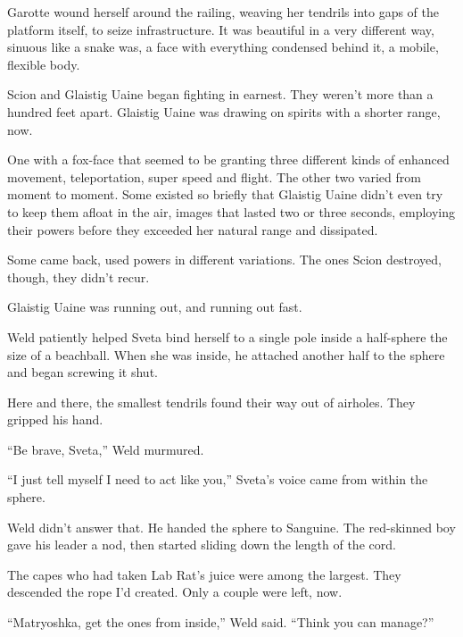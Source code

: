 Garotte wound herself around the railing, weaving her tendrils into gaps of the platform itself, to seize infrastructure.  It was beautiful in a very different way, sinuous like a snake was, a face with everything condensed behind it, a mobile, flexible body.



Scion and Glaistig Uaine began fighting in earnest.  They weren't more than a hundred feet apart.  Glaistig Uaine was drawing on spirits with a shorter range, now.



One with a fox-face that seemed to be granting three different kinds of enhanced movement, teleportation, super speed and flight.  The other two varied from moment to moment.  Some existed so briefly that Glaistig Uaine didn't even try to keep them afloat in the air, images that lasted two or three seconds, employing their powers before they exceeded her natural range and dissipated.



Some came back, used powers in different variations.  The ones Scion destroyed, though, they didn't recur.



Glaistig Uaine was running out, and running out fast.



Weld patiently helped Sveta bind herself to a single pole inside a half-sphere the size of a beachball.  When she was inside, he attached another half to the sphere and began screwing it shut.



Here and there, the smallest tendrils found their way out of airholes.  They gripped his hand.



``Be brave, Sveta,'' Weld murmured.



``I just tell myself I need to act like you,'' Sveta's voice came from within the sphere.



Weld didn't answer that.  He handed the sphere to Sanguine.  The red-skinned boy gave his leader a nod, then started sliding down the length of the cord.



The capes who had taken Lab Rat's juice were among the largest.  They descended the rope I'd created.  Only a couple were left, now.



``Matryoshka, get the ones from inside,'' Weld said.  ``Think you can manage?''



